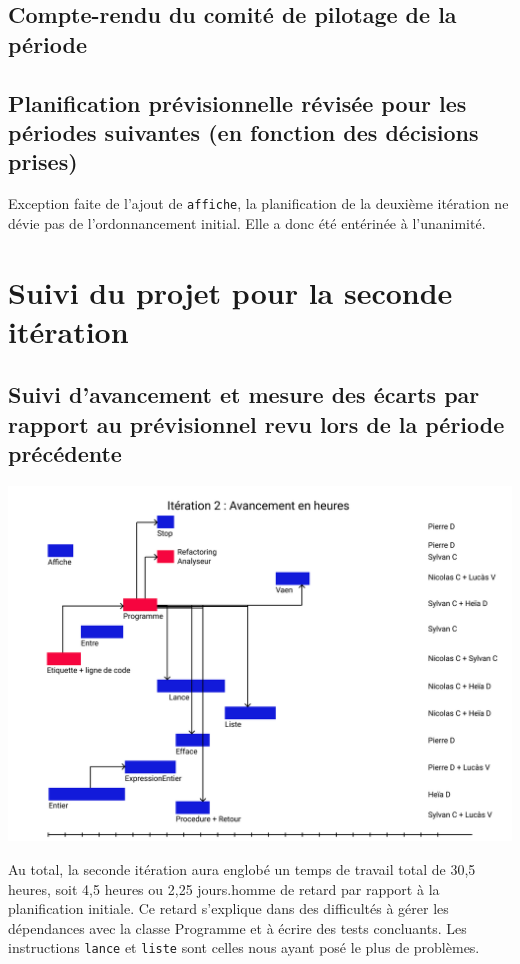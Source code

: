 \documentclass[12pt,a4paper,titlepage,openany, oneside]{report}
\begin{document}
    \subsection{Compte-rendu du comité de pilotage de la période}

    \subsection{Planification prévisionnelle révisée pour les périodes suivantes (en fonction des décisions prises)}
        Exception faite de l'ajout de \verb|affiche|, la planification de la
        deuxième itération ne dévie pas de l'ordonnancement initial. Elle a donc
        été entérinée à l'unanimité.

    \section{Suivi du projet pour la seconde itération}

    \subsection{Suivi d’avancement et mesure des écarts par rapport au prévisionnel revu lors de la période précédente}

    \includegraphics[scale=0.75]{fichiers/planification/iteration2/iteration2Avancement.png}

    Au total, la seconde itération aura englobé un temps de travail total de 30,5 heures,
    soit 4,5 heures ou 2,25 jours.homme de retard par rapport à la planification initiale. Ce
    retard s'explique dans des difficultés à gérer les dépendances avec la classe Programme
    et à écrire des tests concluants. Les instructions \verb|lance| et \verb|liste| sont
    celles nous ayant posé le plus de problèmes.
\end{document}
